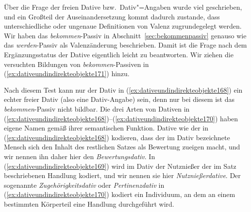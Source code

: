 \begin{exe}
  \ex\label{ex:dativeundindirekteobjekte166}
  \begin{xlist}
  \end{xlist}
\end{exe}


Über die Frage der freien Dative bzw.\ Dativ"=Angaben wurde viel geschrieben, und ein Großteil der Auseinandersetzung kommt dadurch zustande, dass unterschiedliche oder ungenaue Definitionen von Valenz zugrundegelegt werden.
Wir haben das \textit{bekommen}-Passiv in Abschnitt~\ref{sec:bekommenpassiv} genauso wie das \textit{werden}-Passiv als Valenzänderung beschrieben.
Damit ist die Frage nach dem Ergänzungsstatus der Dative eigentlich leicht zu beantworten.
Wir ziehen die versuchten Bildungen von \textit{bekommen}-Passiven in (\ref{ex:dativeundindirekteobjekte171}) hinzu.

\begin{exe}
  \ex\label{ex:dativeundindirekteobjekte171}
  \begin{xlist}
  \end{xlist}
\end{exe}


Nach diesem Test kann nur der Dativ in (\ref{ex:dativeundindirekteobjekte168}) ein echter freier Dativ (also eine Dativ-Angabe) sein, denn nur bei diesem ist das \textit{bekommen}-Passiv nicht bildbar.
Die drei Arten von Dativen in (\ref{ex:dativeundindirekteobjekte168})--(\ref{ex:dativeundindirekteobjekte170}) haben eigene Namen gemäß ihrer semantischen Funktion.
Dative wie der in (\ref{ex:dativeundindirekteobjekte168}) kodieren, dass der im Dativ bezeichnete Mensch sich den Inhalt des restlichen Satzes als Bewertung zueigen macht, und wir nennen ihn daher hier den \textit{Bewertungsdativ}.
In (\ref{ex:dativeundindirekteobjekte169}) wird im Dativ der Nutznießer der im Satz beschriebenen Handlung kodiert, und wir nennen sie hier \textit{Nutznießerdative}.
Der sogenannte \textit{Zugehörigkeitsdativ} oder \textit{Pertinenzdativ} in (\ref{ex:dativeundindirekteobjekte170}) kodiert ein Individuum, an dem an einem bestimmten Körperteil eine Handlung durchgeführt wird.

